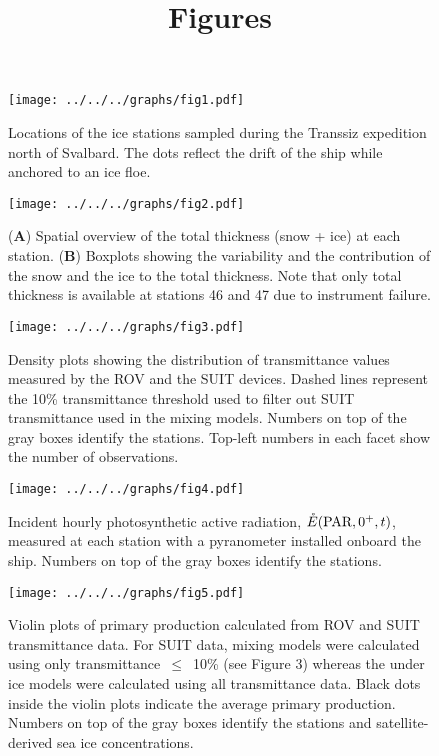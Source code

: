 \documentclass[12pt,a4paper]{scrartcl}
\title{Figures}
\date{}
\begin{document}
\maketitle

\begin{figure}[h]
	\centering
	\texttt{[image: ../../../graphs/fig1.pdf]}
	\caption{Locations of the ice stations sampled during the Transsiz expedition north of Svalbard. The dots reflect the drift of the ship while anchored to an ice floe.}
\end{figure}

\clearpage
\newpage

\begin{figure}[h]
	\centering
	\texttt{[image: ../../../graphs/fig2.pdf]}
	\caption{(\textbf{A}) Spatial overview of the total thickness (snow + ice) at each station. (\textbf{B}) Boxplots showing the variability and the contribution of the snow and the ice to the total thickness. Note that only total thickness is available at stations 46 and 47 due to instrument failure.}
\end{figure}

\clearpage
\newpage

\begin{figure}[h]
	\centering
	\texttt{[image: ../../../graphs/fig3.pdf]}
	\caption{Density plots showing the distribution of transmittance values measured by the ROV and the SUIT devices. Dashed lines represent the 10\% transmittance threshold used to filter out SUIT transmittance used in the mixing models. Numbers on top of the gray boxes identify the stations. Top-left numbers in each facet show the number of observations.}
\end{figure}

\clearpage
\newpage

\begin{figure}[h]
	\centering
	\texttt{[image: ../../../graphs/fig4.pdf]}
	\caption{Incident hourly photosynthetic active radiation, $\mathring{E}(\textnormal{PAR}, 0^+, t)$, measured at each station with a pyranometer installed onboard the ship. Numbers on top of the gray boxes identify the stations.}
\end{figure}

\clearpage
\newpage

\begin{figure}[h]
	\centering
	\texttt{[image: ../../../graphs/fig5.pdf]}
	\caption{Violin plots of primary production calculated from ROV and SUIT transmittance data. For SUIT data, mixing models were calculated using only transmittance~$\le$~10\% (see Figure 3) whereas the under ice models were calculated using all transmittance data. Black dots inside the violin plots indicate the average primary production. Numbers on top of the gray boxes identify the stations and satellite-derived sea ice concentrations.}
\end{figure}
\end{document}
